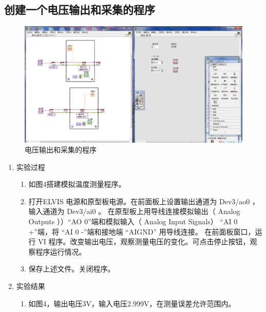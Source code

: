 \documentclass[UTF8]{article}
\begin{document}
\subsection{创建一个电压输出和采集的程序}
\begin{figure}[H]
    \centering
    \includegraphics[width=17cm]{Fig/4.png}
    \caption{电压输出和采集的程序}
\end{figure}
\begin{enumerate}
    \item 实验过程
    \begin{enumerate}
        \item 如图4搭建模拟温度测量程序。
        \item 打开ELVIS 电源和原型板电源。在前面板上设置输出通道为 Dev3/ao0 ，输入通道为 Dev3/ai0 。
        在原型板上用导线连接模拟输出（ Analog Outputs ））“AO 0”端和模拟输入（ Analog Input Signals）
        “AI 0 +”端，将 “AI 0 -”端和接地端 “AIGND” 用导线连接。
        在前面板窗口，运行 VI 程序。改变输出电压，观察测量电压的变化。可点击停止按钮，观察程序运行情况。
        \item 保存上述文件。关闭程序。
    \end{enumerate}
    \item 实验结果
    \begin{enumerate}
        \item 如图4，输出电压3V，输入电压2.999V，在测量误差允许范围内。
    \end{enumerate}
\end{enumerate}
\end{document}
